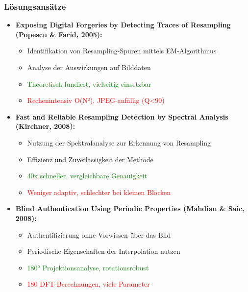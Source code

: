 \documentclass[11pt,t,usepdftitle=false,aspectratio=169]{beamer}
\begin{document}
\begin{frame}
	\frametitle{Lösungsansätze}
	\begin{itemize}
		\item \textbf{Exposing Digital Forgeries by Detecting Traces of Resampling (Popescu \& Farid, 2005):} 
		\begin{itemize}
			\item Identifikation von Resampling-Spuren mittels EM-Algorithmus
			\item Analyse der Auswirkungen auf Bilddaten
			\item \textcolor{green}{Theoretisch fundiert, vielseitig einsetzbar}
			\item \textcolor{red}{Rechenintensiv O(N²), JPEG-anfällig (Q<90)}
		\end{itemize}
		\item \textbf{Fast and Reliable Resampling Detection by Spectral Analysis (Kirchner, 2008):} 
		\begin{itemize}
			\item Nutzung der Spektralanalyse zur Erkennung von Resampling
			\item Effizienz und Zuverlässigkeit der Methode
			\item \textcolor{green}{40x schneller, vergleichbare Genauigkeit}
			\item \textcolor{red}{Weniger adaptiv, schlechter bei kleinen Blöcken}
		\end{itemize}
		\item \textbf{Blind Authentication Using Periodic Properties (Mahdian \& Saic, 2008):} 
		\begin{itemize}
			\item Authentifizierung ohne Vorwissen über das Bild
			\item Periodische Eigenschaften der Interpolation nutzen
			\item \textcolor{green}{180° Projektionsanalyse, rotationsrobust}
			\item \textcolor{red}{180 DFT-Berechnungen, viele Parameter}
		\end{itemize}
	\end{itemize}
\end{frame}
\end{document}
